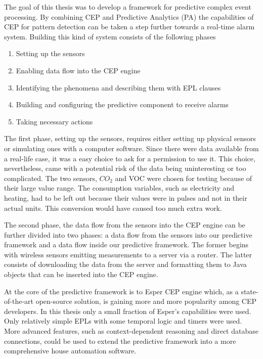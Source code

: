 
The goal of this thesis was to develop a framework for predictive complex event processing. By combining CEP and Predictive Analytics (PA) the capabilities of CEP for pattern detection can be taken a step further towards a real-time alarm system. Building this kind of system consists of the following phases
\begin{enumerate}
\item{Setting up the sensors}
\item{Enabling data flow into the CEP engine}
\item{Identifying the phenomena and describing them with EPL clauses}
\item{Building and configuring the predictive component to receive alarms}
\item{Taking necessary actions}
\end{enumerate}

The first phase, setting up the sensors, requires either setting up physical sensors or simulating ones with a computer software. Since there were data available from a real-life case, it was a easy choice to ask for a permission to use it. This choice, nevertheless, came with a potential risk of the data being uninteresting or too complicated. The two sensors, $CO_2$ and VOC were chosen for testing because of their large value range. The consumption variables, such as electricity and heating, had to be left out because their values were in pulses and not in their actual units. This conversion would have caused too much extra work.

The second phase, the data flow from the sensors into the CEP engine can be further divided into two phases: a data flow from the sensors into our predictive framework and a data flow inside our predictive framework. The former begins with wireless sensors emitting measurements to a server via a router. The latter consists of downloading the data from the server and formatting them to Java objects that can be inserted into the CEP engine.

At the core of the predictive framework is to Esper CEP engine which, as a state-of-the-art open-source solution, is gaining more and more popularity among CEP developers. In this thesis only a small fraction of Esper's capabilities were used. Only relatively simple EPLs with some temporal logic and timers were used. More advanced features, such as context-dependent reasoning and direct database connections, could be used to extend the predictive framework into a more comprehensive house automation software.

